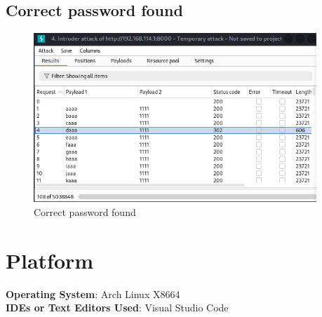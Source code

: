 \documentclass[11pt]{article}
\begin{document}
\subsection{Correct password found}




\begin{figure}[H]
    \centering
    \includegraphics[width=0.95\textwidth]{burpsuite (12).png}
    \caption{Correct password found}
    \label{fig:1}
\end{figure}


\section{Platform}
\textbf{Operating System}: Arch Linux X8664 \\
\textbf{IDEs or Text Editors Used}: Visual Studio Code\\
\end{document}
